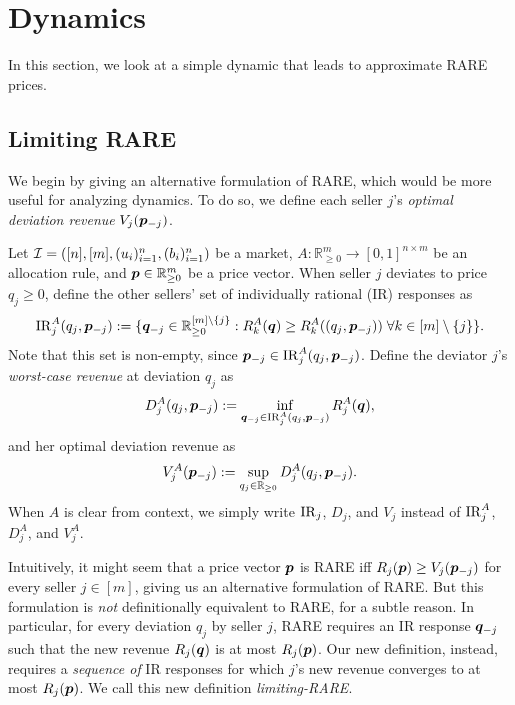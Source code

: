 \section{Dynamics}
\label{sec:dynamics}

In this section, we look at a simple dynamic that leads to approximate RARE prices.

\subsection{Limiting RARE}
\label{sec:lim-rare}

We begin by giving an alternative formulation of RARE,
which would be more useful for analyzing dynamics.
To do so, we define each seller $j$'s \emph{optimal deviation revenue} $V_j(\bm{p}_{-j})$.

\begin{definition}
\label{defn:vj}
Let $\mathcal{I} = ([n], [m], (u_i)_{i=1}^n, (b_i)_{i=1}^n)$ be a market,
$A: \mathbb{R}_{\ge 0}^m \to [0, 1]^{n \times m}$ be an allocation rule,
and $\bm{p} \in \mathbb{R}_{\ge 0}^m$ be a price vector.
When seller $j$ deviates to price $q_j \ge 0$,
define the other sellers' set of individually rational (IR) responses as
\[ \operatorname{IR}^A_j(q_j, \bm{p}_{-j}) := \{\bm{q}_{-j} \in \mathbb{R}_{\ge 0}^{[m] \setminus \{j\}}:
    R^A_k(\bm{q}) \ge R^A_k((q_j, \bm{p}_{-j}))\; \forall k \in [m] \setminus \{j\}\}. \]
Note that this set is non-empty, since $\bm{p}_{-j} \in \operatorname{IR}^A_j(q_j, \bm{p}_{-j})$.
%
Define the deviator $j$'s \emph{worst-case revenue} at deviation $q_j$ as
\[ D^A_j(q_j, \bm{p}_{-j}) := \inf_{\bm{q}_{-j} \in \operatorname{IR}^A_j(q_j, \bm{p}_{-j})} R^A_j(\bm{q}), \]
and her optimal deviation revenue as
\[ V^A_j(\bm{p}_{-j}) := \sup_{q_j \in \mathbb{R}_{\ge 0}} D^A_j(q_j, \bm{p}_{-j}). \]
When $A$ is clear from context, we simply write $\operatorname{IR}_j$, $D_j$, and $V_j$
instead of $\operatorname{IR}^A_j$, $D^A_j$, and $V^A_j$.
\end{definition}

Intuitively, it might seem that a price vector $\bm{p}$ is RARE iff
$R_j(\bm{p}) \ge V_j(\bm{p}_{-j})$ for every seller $j \in [m]$,
giving us an alternative formulation of RARE.
But this formulation is \emph{not} definitionally equivalent to RARE, for a subtle reason.
In particular, for every deviation $q_j$ by seller $j$,
RARE requires an IR response $\bm{q}_{-j}$
such that the new revenue $R_j(\bm{q})$ is at most $R_j(\bm{p})$.
Our new definition, instead, requires a \emph{sequence of} IR responses for which $j$'s new revenue
converges to at most $R_j(\bm{p})$.
We call this new definition \emph{limiting-RARE}.

